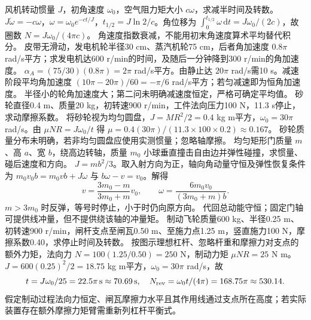 \problemtext 风机转动惯量 $J$，初角速度 $\omega_0$，空气阻力矩大小 $c\omega$，求减半时间及转数。
\workings $J\dot\omega=-c\omega$，$\omega=\omega_0e^{-ct/J}$，$t_{1/2}=J\ln2/c$。角位移为 $\int_0^{t_{1/2}}\omega\,\mathrm dt=J\omega_0/(2c)$，故圈数 $N=J\omega_0/(4\pi c)$。
\crosscheck 角速度指数衰减，不能用初末角速度算术平均替代积分。
\problemtext 皮带无滑动，发电机轮半径30 cm、蒸汽机轮75 cm，后者角加速度 $0.8\pi$ rad/s平方；求发电机达600 r/min的时间，及随后一分钟降到300 r/min的角加速度。
\workings $\alpha_A=(75/30)(0.8\pi)=2\pi$ rad/s平方。由静止达 $20\pi$ rad/s需10 s。减速阶段平均角加速度 $(10\pi-20\pi)/60=-\pi/6$ rad/s平方；若匀减速即为恒角加速度。
\crosscheck 半径小的轮角加速度大；第二问未明确减速度恒定，严格可确定平均值。
\problemtext 砂轮直径0.4 m、质量20 kg，初转速900 r/min，工件法向压力100 N，11.3 s停止，求动摩擦系数。
\workings 将砂轮视为均匀圆盘，$J=MR^2/2=0.4$ kg m平方，$\omega_0=30\pi$ rad/s。由 $\mu NR=J\omega_0/t$ 得 $\mu=0.4(30\pi)/(11.3\times100\times0.2)\approx0.167$。
\crosscheck 砂轮质量分布未明确，若非均匀圆盘应使用实测惯量；忽略轴摩擦。
\problemtext 均匀矩形门质量 $m$、高 $a$、宽 $b$，绕高边转轴，质量 $m_0$ 小球垂直撞击自由边并弹性碰撞，求惯量、碰后速度和方向。
\workings $J=mb^2/3$。取入射方向为正，轴向角动量守恒及弹性恢复条件为 $m_0v_0b=m_0vb+J\omega$ 与 $b\omega-v=v_0$。解得
\[
v=\frac{3m_0-m}{3m_0+m}v_0,\qquad
\omega=\frac{6m_0v_0}{(3m_0+m)b}.
\]
$m>3m_0$ 时反弹，等号时停止，小于时仍向原方向。
\crosscheck 代回总动能守恒；固定门轴可提供线冲量，但不提供绕该轴的冲量矩。
\problemtext 制动飞轮质量600 kg、半径0.25 m、初转速900 r/min，闸杆支点至闸瓦0.50 m、至施力点1.25 m，竖直施力100 N，摩擦系数0.40，求停止时间及转数。
\workings 按图示理想杠杆、忽略杆重和摩擦力对支点的额外力矩，法向力 $N=100(1.25/0.50)=250$ N，制动力矩 $\mu NR=25$ N m。$J=600(0.25)^2/2=18.75$ kg m平方，$\omega_0=30\pi$ rad/s，故
\[
t=J\omega_0/25=22.5\pi\,\mathrm s\approx70.69\,\mathrm s,\quad
N_{\rm rev}=\omega_0t/(4\pi)=168.75\pi\approx530.14.
\]
\crosscheck 假定制动过程法向力恒定、闸瓦摩擦力水平且其作用线通过支点所在高度；若实际装置存在额外摩擦力矩臂需重新列杠杆平衡式。
